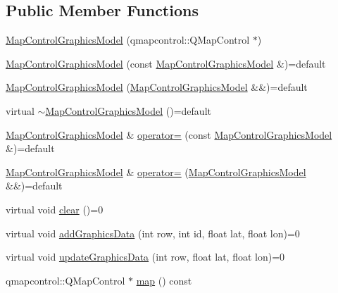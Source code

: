\subsection*{Public Member Functions}
\begin{DoxyCompactItemize}
\item 
\mbox{\hyperlink{class_map_control_graphics_model_aa3429f7a893134fa192f8d5822e3517f}{Map\+Control\+Graphics\+Model}} (qmapcontrol\+::\+Q\+Map\+Control $\ast$)
\item 
\mbox{\hyperlink{class_map_control_graphics_model_ada7ff98adbb7171730d7eb82f8245a4c}{Map\+Control\+Graphics\+Model}} (const \mbox{\hyperlink{class_map_control_graphics_model}{Map\+Control\+Graphics\+Model}} \&)=default
\item 
\mbox{\hyperlink{class_map_control_graphics_model_a1e515a8fa099ad0dd3355ef3710bcc24}{Map\+Control\+Graphics\+Model}} (\mbox{\hyperlink{class_map_control_graphics_model}{Map\+Control\+Graphics\+Model}} \&\&)=default
\item 
virtual \mbox{\hyperlink{class_map_control_graphics_model_a41f14c0b71ed9e8b790d6e23677be708}{$\sim$\+Map\+Control\+Graphics\+Model}} ()=default
\item 
\mbox{\hyperlink{class_map_control_graphics_model}{Map\+Control\+Graphics\+Model}} \& \mbox{\hyperlink{class_map_control_graphics_model_a90e3c5e9966a507598f37e7a2a3ad509}{operator=}} (const \mbox{\hyperlink{class_map_control_graphics_model}{Map\+Control\+Graphics\+Model}} \&)=default
\item 
\mbox{\hyperlink{class_map_control_graphics_model}{Map\+Control\+Graphics\+Model}} \& \mbox{\hyperlink{class_map_control_graphics_model_af5786286f5f3e888f5a4ada3eb1547bf}{operator=}} (\mbox{\hyperlink{class_map_control_graphics_model}{Map\+Control\+Graphics\+Model}} \&\&)=default
\item 
virtual void \mbox{\hyperlink{class_map_control_graphics_model_a2cfbe94a0c1124d5af186a75245de1e2}{clear}} ()=0
\item 
virtual void \mbox{\hyperlink{class_map_control_graphics_model_ac80001f23a6059b9f8d600200920a5ea}{add\+Graphics\+Data}} (int row, int id, float lat, float lon)=0
\item 
virtual void \mbox{\hyperlink{class_map_control_graphics_model_ae5a590579987d471211cf59c61b1b54c}{update\+Graphics\+Data}} (int row, float lat, float lon)=0
\item 
qmapcontrol\+::\+Q\+Map\+Control $\ast$ \mbox{\hyperlink{class_map_control_graphics_model_ab2275e899196413e12f8146c407548c2}{map}} () const
\end{DoxyCompactItemize}


